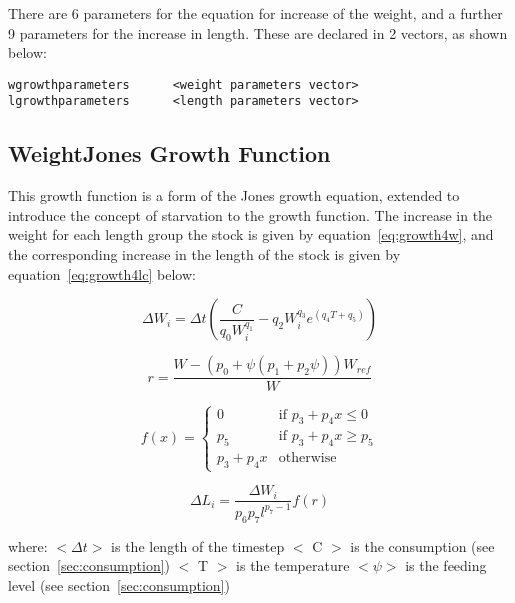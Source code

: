 \documentclass [a4paper, 10pt]{book}
\begin{document}
\bigskip
There are 6 parameters for the equation for increase of the weight, and a further 9 parameters for the increase in length.  These are declared in 2 vectors, as shown below:

{\small\begin{verbatim}
wgrowthparameters      <weight parameters vector>
lgrowthparameters      <length parameters vector>
\end{verbatim}}

\subsection{WeightJones Growth Function}\label{subsec:growth4}
This growth function is a form of the Jones growth equation\footnotemark, extended to introduce the concept of starvation to the growth function.  The increase in the weight for each length group the stock is given by equation~\ref{eq:growth4w}, and the corresponding increase in the length of the stock is given by equation~\ref{eq:growth4lc} below:

\begin{equation}\label{eq:growth4w}
\Delta W_{i} = \Delta t \left( \frac{C}{q_{0} W_{i}^{q_{1}}} - q_{2} W_{i}^{q_{3}} e^{(q_{4} T + q_{5})} \right)
\end{equation}

\begin{equation}\label{eq:growth4la}
r = \frac{W - \left( p_{0} + \psi \left( p_{1} + p_{2}\psi \right) \right) W_{ref}}{W}
\end{equation}

\begin{equation}\label{eq:growth4lb}
f(x) =
\begin{cases}
0 & \textrm{if $p_{3} + p_{4}x \leq 0$} \\
p_{5} & \textrm{if $p_{3} + p_{4}x \geq p_{5}$} \\
p_{3} + p_{4}x & \textrm{otherwise}
\end{cases}
\end{equation}

\begin{equation}\label{eq:growth4lc}
\Delta L_{i} = \frac{\Delta W_{i}} {p_{6} p_{7} l^{p_{7} - 1}} f(r)
\end{equation}

where:\newline
$<\Delta t>$ is the length of the timestep\newline
$<$ C $>$ is the consumption (see section~\ref{sec:consumption})\newline
$<$ T $>$ is the temperature\newline
$<\psi>$ is the feeding level (see section~\ref{sec:consumption})
\end{document}
